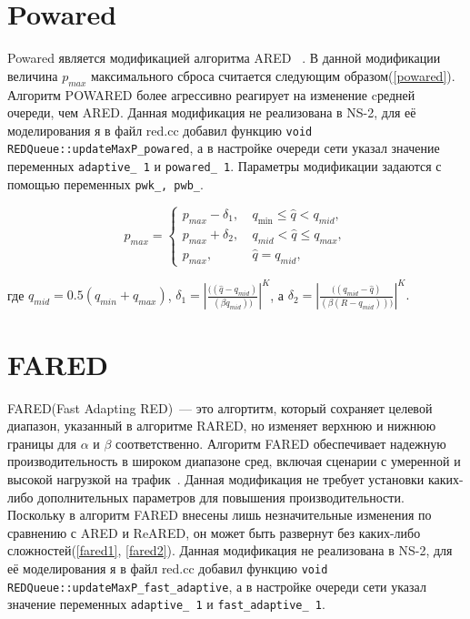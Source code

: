  
\section{Powared}
\label{chap2:sec12}




Powared является модификацией алгоритма ARED ~\cite{Powared}. В данной модификации величина $p_{max}$ максимального сброса считается следующим образом(\ref{powared}). Алгоритм POWARED более агрессивно реагирует на изменение cредней очереди, чем ARED. Данная модификация не реализована в NS-2, для её моделирования я в файл red.cc добавил функцию \verb|void REDQueue::updateMaxP_powared|, а в настройке очереди сети указал значение переменных \verb|adaptive_ 1| и \verb|powared_ 1|. 
Параметры модификации задаются с помощью переменных \verb|pwk_, pwb_|.

\begin{equation}
\label{powared}
p_{max} =\begin{cases}
        p_{max}-\delta_1, &  \  q_{\min} \leqslant \hat{q} < q_{mid}, 
        \\
        p_{max}+\delta_2, & \ q_{mid} < \hat{q}  \leqslant q_{max}, 
        \\
        p_{max}, &  \ \hat{q} =  q_{mid},
\end{cases}
\end{equation}

где $q_{mid} = 0.5(q_{min} + q_{max})$, 
$\delta_1 = |\frac{((\hat{q} - q_{mid})}{(\beta q_{mid}))}|^K $, а $\delta_2 = |\frac{((q_{mid} - \hat{q})}{(\beta (R -q_{mid})))}|^K.$


\section{FARED}
\label{chap2:sec13}



FARED(Fast Adapting RED)~--- это алгортитм, который сохраняет целевой диапазон, указанный в алгоритме RARED, но изменяет верхнюю и нижнюю границы для $\alpha $ и $\beta$ соответственно. Алгоритм FARED обеспечивает надежную производительность в широком диапазоне сред, включая сценарии с умеренной и высокой нагрузкой на трафик~\cite{Tahiliani_2012}.
Данная модификация не требует установки каких-либо дополнительных параметров для повышения производительности. Поскольку в алгоритм FARED внесены лишь незначительные изменения по сравнению
с ARED и ReARED, он может быть развернут без каких-либо сложностей(\ref{fared1}, \ref{fared2}). Данная модификация не реализована в NS-2, для её моделирования я в файл red.cc добавил функцию \verb|void REDQueue::updateMaxP_fast_adaptive|, а в настройке очереди сети указал значение переменных \verb|adaptive_ 1| 
и \verb|fast_adaptive_ 1|. 

